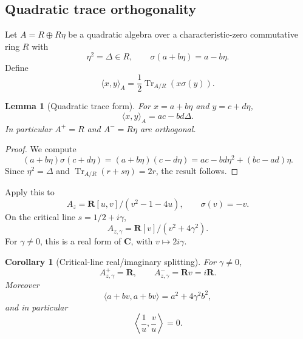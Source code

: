 \documentclass[11pt]{article}
\newcommand{\C}{\mathbf C}
\newcommand{\R}{\mathbf R}
\newcommand{\Tr}{\operatorname{Tr}}
\newcommand{\1}{\mathbf 1}
\newtheorem{lemma}[theorem]{Lemma}
\newtheorem{corollary}[theorem]{Corollary}
\numberwithin{equation}{section}
\begin{document}
\subsection{Quadratic trace orthogonality}

Let $A=R\oplus R\eta$ be a quadratic algebra over a characteristic-zero commutative ring $R$ with
\begin{equation}
  \eta^2=\Delta\in R,
  \qquad
  \sigma(a+b\eta)=a-b\eta.
\end{equation}
Define
\begin{equation}
  \langle x,y\rangle_A=\frac12\Tr_{A/R}(x\sigma(y)).
\end{equation}

\begin{lemma}[Quadratic trace form]\label{lem:quadratic-trace}
For $x=a+b\eta$ and $y=c+d\eta$,
\begin{equation}
  \langle x,y\rangle_A=ac-bd\Delta.
\end{equation}
In particular $A^+=R$ and $A^-=R\eta$ are orthogonal.
\end{lemma}

\begin{proof}
We compute
\begin{equation}
  (a+b\eta)\sigma(c+d\eta)=(a+b\eta)(c-d\eta)
  =ac-bd\eta^2+(bc-ad)\eta.
\end{equation}
Since $\eta^2=\Delta$ and $\Tr_{A/R}(r+s\eta)=2r$, the result follows.
\end{proof}

Apply this to
\begin{equation}
  A_z=\R[u,v]/(v^2-1-4u),
  \qquad \sigma(v)=-v.
\end{equation}
On the critical line $s=1/2+i\gamma$,
\begin{equation}
  A_{z,\gamma}=\R[v]/(v^2+4\gamma^2).
\end{equation}
For $\gamma\ne0$, this is a real form of $\C$, with $v\mapsto2i\gamma$.

\begin{corollary}[Critical-line real/imaginary splitting]\label{cor:critical-orthogonality}
For $\gamma\ne0$,
\begin{equation}
  A_{z,\gamma}^+=\R,
  \qquad
  A_{z,\gamma}^-=\R v=i\R.
\end{equation}
Moreover
\begin{equation}
  \langle a+bv,a+bv\rangle=a^2+4\gamma^2b^2,
\end{equation}
and in particular
\begin{equation}
  \left\langle\frac1u,\frac vu\right\rangle=0.
\end{equation}
\end{corollary}
\end{document}
